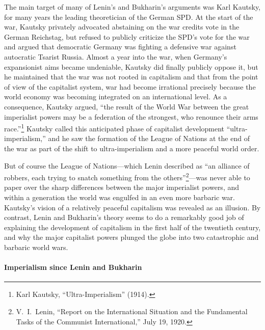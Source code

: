 The main target of many of Lenin's and Bukharin's arguments was Karl Kautsky, for many years the leading theoretician of the German SPD. At the start of the war, Kautsky privately advocated abstaining on the war credits vote in the German Reichstag, but refused to publicly criticize the SPD's vote for the war and argued that democratic Germany was fighting a defensive war against autocratic Tsarist Russia. Almost a year into the war, when Germany's expansionist aims became undeniable, Kautsky did finally publicly oppose it, but he maintained that the war was not rooted in capitalism and that from the point of view of the capitalist system, war had become irrational precisely because the world economy was becoming integrated on an international level. As a consequence, Kautsky argued, ``the result of the World War between the great imperialist powers may be a federation of the strongest, who renounce their arms race.''\footnote{Karl Kautsky, ``Ultra-Imperialism'' (1914).} Kautsky called this anticipated phase of capitalist development ``ultra-imperialism,'' and he saw the formation of the League of Nations at the end of the war as part of the shift to ultra-imperialism and a more peaceful world order.

But of course the League of Nations---which Lenin described as ``an alliance of robbers, each trying to snatch something from the others''\footnote{V.\ I.\ Lenin, ``Report on the International Situation and the Fundamental Tasks of the Communist International,'' July 19, 1920.}---was never able to paper over the sharp differences between the major imperialist powers, and within a generation the world was engulfed in an even more barbaric war. Kautsky's vision of a relatively peaceful capitalism was revealed as an illusion. By contrast, Lenin and Bukharin's theory seems to do a remarkably good job of explaining the development of capitalism in the first half of the twentieth century, and why the major capitalist powers plunged the globe into two catastrophic and barbaric world wars.

\paragraph{Imperialism since Lenin and Bukharin}

